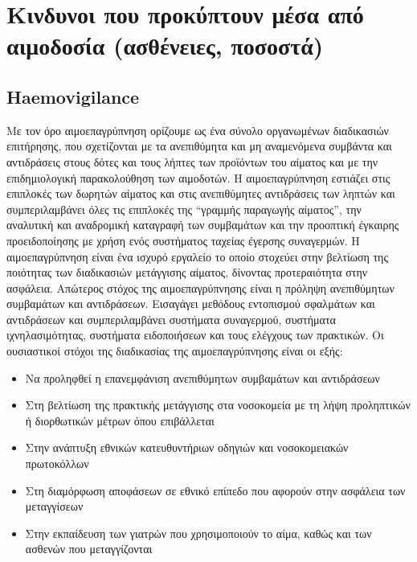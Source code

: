 \section{Κινδυνοι που προκύπτουν μέσα από αιμοδοσία (ασθένειες, ποσοστά)}
	\subsection{Haemovigilance}
	
	Με τον όρο αιμοεπαγρύπνηση ορίζουμε ως ένα σύνολο οργανωμένων διαδικασιών επιτήρησης, που σχετίζονται με τα ανεπιθύμητα και μη αναμενόμενα συμβάντα και αντιδράσεις στους δότες και τους λήπτες των προϊόντων του αίματος και με την επιδημιολογική παρακολούθηση των αιμοδοτών. \cite{VOX:VOX1442}Η αιμοεπαγρύπνηση εστιάζει στις  επιπλοκές των δωρητών αίματος και στις ανεπιθύμητες αντιδράσεις των ληπτών και συμπεριλαμβάνει όλες τις επιπλοκές της “γραμμής παραγωγής αίματος”, την αναλυτική και αναδρομική καταγραφή των συμβαμάτων και την προοπτική έγκαιρης προειδοποίησης με χρήση ενός συστήματος ταχείας έγερσης συναγερμών. Η αιμοεπαγρύπνηση είναι ένα ισχυρό εργαλείο το οποίο στοχεύει στην βελτίωση της ποιότητας των διαδικασιών μετάγγισης αίματος, δίνοντας προτεραιότητα στην ασφάλεια. Απώτερος στόχος της αιμοεπαγρύπνησης είναι η πρόληψη ανεπιθύμητων συμβαμάτων και αντιδράσεων. Εισαγάγει μεθόδους εντοπισμού σφαλμάτων και αντιδράσεων και συμπεριλαμβάνει συστήματα συναγερμού, συστήματα ιχνηλασιμότητας, συστήματα ειδοποιήσεων και τους ελέγχους των πρακτικών.
	Οι ουσιαστικοί στόχοι της διαδικασίας της αιμοεπαγρύπνησης είναι οι εξής:
		\begin{itemize}
		\item Να προληφθεί η επανεμφάνιση ανεπιθύμητων συμβαμάτων και αντιδράσεων 
		\item Στη βελτίωση της πρακτικής μετάγγισης στα νοσοκομεία με τη λήψη προληπτικών ή διορθωτικών μέτρων όπου επιβάλλεται 
		\item Στην ανάπτυξη εθνικών κατευθυντήριων οδηγιών και νοσοκομειακών πρωτοκόλλων 
		\item Στη διαμόρφωση αποφάσεων σε εθνικό επίπεδο που αφορούν στην ασφάλεια των μεταγγίσεων 
		\item Στην εκπαίδευση των γιατρών που χρησιμοποιούν το αίμα, καθώς και των ασθενών που μεταγγίζονται 
		\end{itemize}

